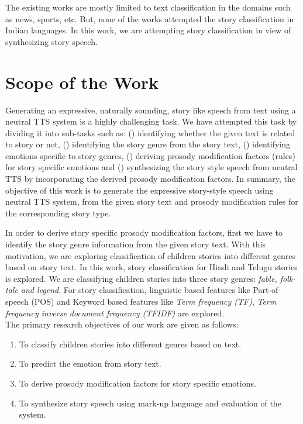 \documentclass[times, 11pt, a4paper]{article}
\begin{document}
The existing works are mostly limited to text classification in the domains such as news, sports, etc. But, none of the works attempted the story classification in Indian languages. In this work, we are attempting story classification in view of synthesizing story speech.



\section{Scope of the Work}


Generating an expressive, naturally sounding, story like speech from text using a neutral TTS system is a highly challenging task. We have attempted this task by dividing it into sub-tasks such as: () identifying whether the given text is related to story or not, () identifying the story genre from the story text, () identifying emotions specific to story genres, () deriving prosody modification factors (rules) for story specific emotions and () synthesizing the story style speech from neutral TTS by incorporating the derived prosody modification factors. In summary, the objective of this work is to generate the expressive story-style speech using neutral TTS system, from the given story text and prosody modification rules for the corresponding story type.

In order to derive story specific prosody modification factors, first we have to identify the story genre information from the given story text. With this motivation, we are exploring classification of children stories into different genres based on story text. In this work, story classification for Hindi and Telugu stories is explored. We are classifying children stories into three story genres: \textit{fable, folk-tale and legend}. For story classification, linguistic based features like Part-of-speech (POS) and Keyword based features like \textit{Term frequency (TF)}, \textit{Term frequency inverse document frequency (TFIDF)} are explored. \\

The primary research objectives of our work are given as follows:

\begin{enumerate}
\item To classify children stories into different genres based on text.
\item To predict the emotion from story text.
\item To derive prosody modification factors for story specific emotions.
\item To synthesize story speech using mark-up language and evaluation of the system.
\end{enumerate}
\end{document}
